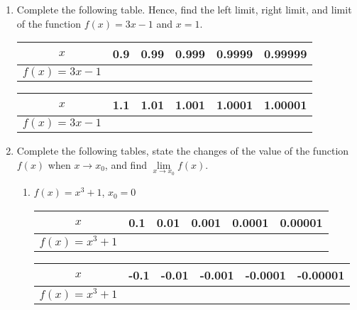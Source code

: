 \documentclass[12pt]{report}
\begin{document}
\begin{enumerate}
    \item Complete the following table. Hence, find the left limit, right limit, and
          limit of the function $f (x) = 3x - 1$ and $x = 1$.
          \begin{center}
              \begin{tabular}{|c|c|c|c|c|c|}
                  \hline
                  $x$              & 0.9 & 0.99 & 0.999 & 0.9999 & 0.99999 \\
                  \hline
                  $f (x) = 3x - 1$ &     &      &       &        &         \\
                  \hline
              \end{tabular}
              \vskip 0.2cm
              \begin{tabular}{|c|c|c|c|c|c|}
                  \hline
                  $x$              & 1.1 & 1.01 & 1.001 & 1.0001 & 1.00001 \\
                  \hline
                  $f (x) = 3x - 1$ &     &      &       &        &         \\
                  \hline
              \end{tabular}
          \end{center}

    \item Complete the following tables, state the changes of the value of the function
          $f (x)$ when $x \to x_0$, and find $\lim\limits_{x \to x_0} f (x)$.
          \begin{enumerate}
              \item $f (x) = x^3 + 1$, $x_0 = 0$
                    \begin{center}
                        \begin{tabular}{|c|c|c|c|c|c|}
                            \hline
                            $x$               & 0.1 & 0.01 & 0.001 & 0.0001 & 0.00001 \\
                            \hline
                            $f (x) = x^3 + 1$ &     &      &       &        &         \\
                            \hline
                        \end{tabular}
                        \vskip 0.2cm
                        \begin{tabular}{|c|c|c|c|c|c|}
                            \hline
                            $x$               & -0.1 & -0.01 & -0.001 & -0.0001 & -0.00001 \\
                            \hline
                            $f (x) = x^3 + 1$ &      &       &        &         &          \\
                            \hline
                        \end{tabular}
                    \end{center}


\end{enumerate}
\end{enumerate}
\end{document}
